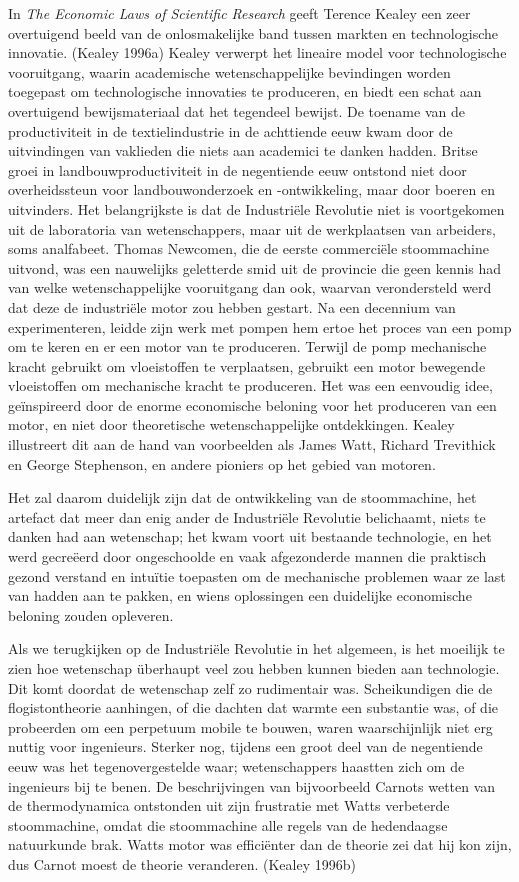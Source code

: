 \documentclass[
  a5paper,
  smalldemyvopaper,11pt,twoside,onecolumn,openright,extrafontsizes,
hidelinks]{memoir}
\begin{document}
In \emph{The Economic Laws of Scientific Research} geeft Terence Kealey
een zeer overtuigend beeld van de onlosmakelijke band tussen markten en
technologische innovatie. (Kealey 1996a) Kealey verwerpt het lineaire
model voor technologische vooruitgang, waarin academische
wetenschappelijke bevindingen worden toegepast om technologische
innovaties te produceren, en biedt een schat aan overtuigend
bewijsmateriaal dat het tegendeel bewijst. De toename van de
productiviteit in de textielindustrie in de achttiende eeuw kwam door de
uitvindingen van vaklieden die niets aan academici te danken hadden.
Britse groei in landbouwproductiviteit in de negentiende eeuw ontstond
niet door overheidssteun voor landbouwonderzoek en -ontwikkeling, maar
door boeren en uitvinders. Het belangrijkste is dat de Industriële
Revolutie niet is voortgekomen uit de laboratoria van wetenschappers,
maar uit de werkplaatsen van arbeiders, soms analfabeet. Thomas
Newcomen, die de eerste commerciële stoommachine uitvond, was een
nauwelijks geletterde smid uit de provincie die geen kennis had van
welke wetenschappelijke vooruitgang dan ook, waarvan verondersteld werd
dat deze de industriële motor zou hebben gestart. Na een decennium van
experimenteren, leidde zijn werk met pompen hem ertoe het proces van een
pomp om te keren en er een motor van te produceren. Terwijl de pomp
mechanische kracht gebruikt om vloeistoffen te verplaatsen, gebruikt een
motor bewegende vloeistoffen om mechanische kracht te produceren. Het
was een eenvoudig idee, geïnspireerd door de enorme economische beloning
voor het produceren van een motor, en niet door theoretische
wetenschappelijke ontdekkingen. Kealey illustreert dit aan de hand van
voorbeelden als James Watt, Richard Trevithick en George Stephenson, en
andere pioniers op het gebied van motoren.

Het zal daarom duidelijk zijn dat de ontwikkeling van de stoommachine,
het artefact dat meer dan enig ander de Industriële Revolutie
belichaamt, niets te danken had aan wetenschap; het kwam voort uit
bestaande technologie, en het werd gecreëerd door ongeschoolde en vaak
afgezonderde mannen die praktisch gezond verstand en intuïtie toepasten
om de mechanische problemen waar ze last van hadden aan te pakken, en
wiens oplossingen een duidelijke economische beloning zouden opleveren.

Als we terugkijken op de Industriële Revolutie in het algemeen, is het
moeilijk te zien hoe wetenschap überhaupt veel zou hebben kunnen bieden
aan technologie. Dit komt doordat de wetenschap zelf zo rudimentair was.
Scheikundigen die de flogistontheorie aanhingen, of die dachten dat
warmte een substantie was, of die probeerden om een perpetuum mobile te
bouwen, waren waarschijnlijk niet erg nuttig voor ingenieurs. Sterker
nog, tijdens een groot deel van de negentiende eeuw was het
tegenovergestelde waar; wetenschappers haastten zich om de ingenieurs
bij te benen. De beschrijvingen van bijvoorbeeld Carnots wetten van de
thermodynamica ontstonden uit zijn frustratie met Watts verbeterde
stoommachine, omdat die stoommachine alle regels van de hedendaagse
natuurkunde brak. Watts motor was efficiënter dan de theorie zei dat hij
kon zijn, dus Carnot moest de theorie veranderen. (Kealey 1996b)
\end{document}
